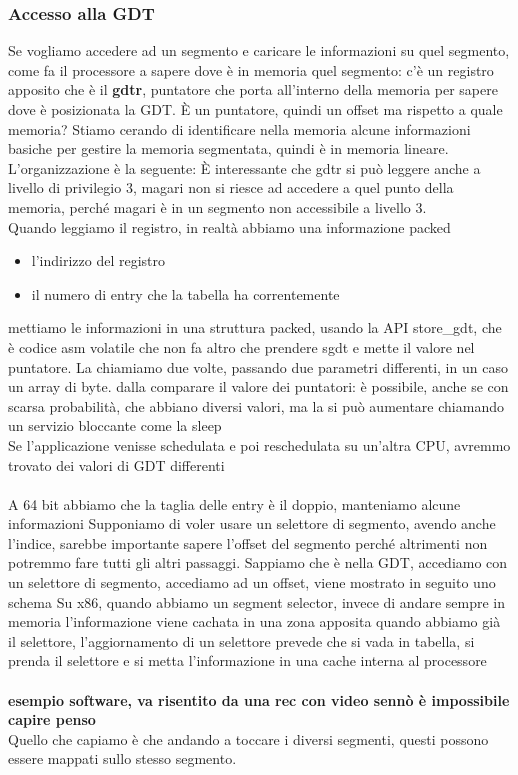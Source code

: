 \documentclass[12pt, oneside]{extbook}
\begin{document}
\subsubsection{Accesso alla GDT}
Se vogliamo accedere ad un segmento e caricare le informazioni su quel segmento, come fa il processore a sapere dove è in memoria quel segmento: c'è un registro apposito che è il \textbf{gdtr}, puntatore che porta all'interno della memoria per sapere dove è posizionata la GDT. È un puntatore, quindi un offset ma rispetto a quale memoria? Stiamo cerando di identificare nella memoria alcune informazioni basiche per gestire la memoria segmentata, quindi è in memoria lineare. L'organizzazione è la seguente:
È interessante che gdtr si può leggere anche a livello di privilegio 3, magari non si riesce ad accedere a quel punto della memoria, perché magari è in un segmento non accessibile a livello 3.\\ Quando leggiamo il registro, in realtà abbiamo una informazione packed
\begin{itemize}
\item l'indirizzo del registro
\item il numero di entry che la tabella ha correntemente
\end{itemize}
mettiamo le informazioni in una struttura packed, usando la API \textsf{store\_gdt}, che è codice asm volatile che non fa altro che prendere sgdt e mette il valore nel puntatore. La chiamiamo due volte, passando due parametri differenti, in un caso un array di byte.
dalla comparare il valore dei puntatori: è possibile, anche se con scarsa probabilità, che abbiano diversi valori, ma la si può aumentare chiamando un servizio bloccante come la sleep\\ Se l'applicazione venisse schedulata e poi reschedulata su un'altra CPU, avremmo trovato dei valori di GDT differenti\\\\ A 64 bit abbiamo che la taglia delle entry è il doppio,  manteniamo alcune informazioni 
Supponiamo di voler usare un selettore di segmento, avendo anche l'indice, sarebbe importante sapere l'offset del segmento perché altrimenti non potremmo fare tutti gli altri passaggi. Sappiamo che è nella GDT, accediamo con un selettore di segmento, accediamo ad un offset, viene  mostrato in seguito uno schema
Su x86, quando abbiamo un segment selector, invece di andare sempre in memoria l'informazione viene cachata in una zona apposita quando abbiamo già il selettore, l'aggiornamento di un selettore prevede che si vada in tabella, si prenda il selettore e si metta l'informazione in una cache interna al processore\\\\
\textbf{esempio software, va risentito da una rec con video sennò è impossibile capire penso}\\
Quello che capiamo è che andando a toccare i diversi segmenti, questi possono essere mappati sullo stesso segmento.
\end{document}
